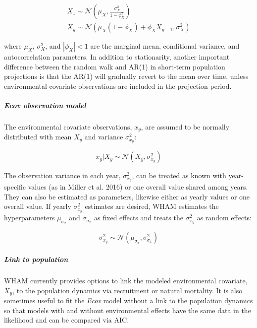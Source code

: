 \documentclass[]{article}
\let\oldsubparagraph\subparagraph
\renewcommand{\subparagraph}[1]{\oldsubparagraph{#1}\mbox{}}
\begin{document}
\begin{equation}
  \begin{array}{cc}
    X_1 \sim \mathcal{N} \left( \mu_X, \frac{\sigma^2_X}{1-\phi^2_X} \right) \\
    X_y \sim \mathcal{N} \left( \mu_X(1-\phi_X) + \phi_X X_{y-1}, \sigma^2_X \right)
  \end{array}
\end{equation}

where \(\mu_X\), \(\sigma^2_X\), and \(|\phi_X| < 1\) are the marginal
mean, conditional variance, and autocorrelation parameters. In addition
to stationarity, another important difference between the random walk
and AR(1) in short-term population projections is that the AR(1) will
gradually revert to the mean over time, unless environmental covariate
observations are included in the projection period.

\hypertarget{ecov-observation-model}{%
\subparagraph{\texorpdfstring{\emph{Ecov} observation
model}{Ecov observation model}}\label{ecov-observation-model}}

The environmental covariate observations, \(x_y\), are assumed to be
normally distributed with mean \(X_y\) and variance \(\sigma^2_{x_y}\):

\[x_y | X_y \sim \mathcal{N}\left( X_y, \sigma^2_{x_y} \right)\]

The observation variance in each year, \(\sigma^2_{x_y}\), can be
treated as known with year-specific values (as in Miller et al. 2016) or
one overall value shared among years. They can also be estimated as
parameters, likewise either as yearly values or one overall value. If
yearly \(\sigma^2_{x_y}\) estimates are desired, WHAM estimates the
hyperparameters \(\mu_{\sigma_x}\) and \(\sigma_{\sigma_x}\) as fixed
effects and treats the \(\sigma^2_{x_y}\) as random effects:

\[\sigma^2_{x_y} \sim \mathcal{N} \left( \mu_{\sigma_x}, \sigma^2_{\sigma_x} \right)\]

\hypertarget{link-to-population}{%
\subparagraph{Link to population}\label{link-to-population}}

WHAM currently provides options to link the modeled environmental
covariate, \(X_y\), to the population dynamics via recruitment or
natural mortality. It is also sometimes useful to fit the \emph{Ecov}
model without a link to the population dynamics so that models with and
without environmental effects have the same data in the likelihood and
can be compared via AIC.
\end{document}
